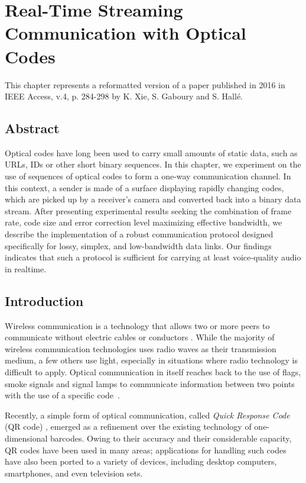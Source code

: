 
\chapter{Real-Time Streaming Communication with Optical Codes}

This chapter represents a reformatted version of a paper published in 2016 in IEEE Access, v.4, p. 284-298 by K. Xie, S. Gaboury and S. Hallé.

\section*{Abstract}
Optical codes have long been used to carry small amounts of static data, such as URLs, IDs or other short binary sequences. In this chapter, we experiment on the use of sequences of optical codes to form a one-way communication channel. In this context, a sender is made of a surface displaying rapidly changing codes, which are picked up by a receiver's camera and converted back into a binary data stream. After presenting experimental results seeking the combination of frame rate, code size and error correction level maximizing effective bandwidth, we describe the implementation of a robust communication protocol designed specifically for lossy, simplex, and low-bandwidth data links. Our findings indicates that such a protocol is sufficient for carrying at least voice-quality audio in realtime.

\section{Introduction}\label{sec:qr:intro} %

Wireless communication is a technology that allows two or more peers to communicate without electric cables or conductors \citep{tse2005fundamentals}. While the majority of wireless communication technologies uses radio waves as their transmission medium, a few others use light, especially in situations where radio technology is difficult to apply. Optical communication in itself reaches back to the use of flags, smoke signals and signal lamps to communicate information between two points with the use of a specific code~\citep{burns2004}.

Recently, a simple form of optical communication, called \emph{Quick Response Code} (QR code) \citep{qrcode-about}, emerged as a refinement over the existing technology of one-dimensional barcodes. Owing to their accuracy and their considerable capacity, QR codes have been used in many areas; applications for handling such codes have also been ported to a variety of devices, including desktop computers, smartphones, and even television sets.

